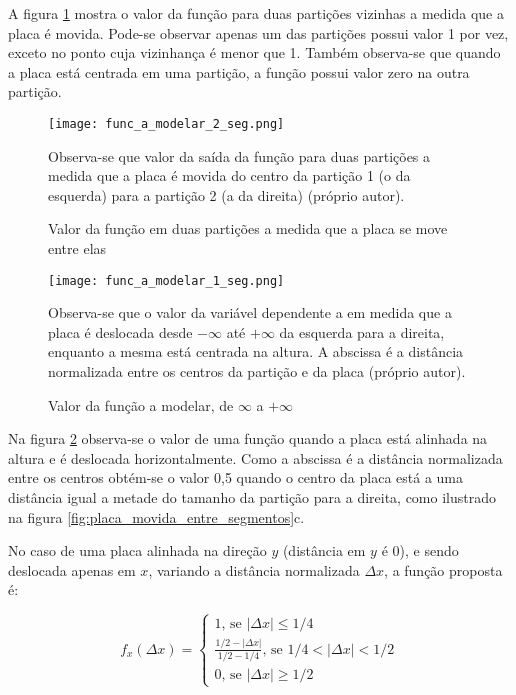 A figura \ref{fig:func_a_modelar_2_seg} mostra o valor da função para
duas partições vizinhas a medida que a placa é movida. Pode-se observar apenas
um das partições possui valor 1 por vez, exceto no ponto cuja vizinhança é
menor que 1. Também observa-se
que quando a placa está centrada em uma partição, a função possui valor zero
na outra partição.

\begin{figure}[!htb]
	\centering
	\texttt{[image: func\_a\_modelar\_2\_seg.png]}
	\caption{Valor da função em duas partições a medida que a placa se move
	entre elas}
	\label{fig:func_a_modelar_2_seg}
	Observa-se que valor da saída da função para duas partições a medida que a
	placa é movida do centro da partição 1 (o da esquerda) para a partição 2 (a
	da direita) (próprio autor).
\end{figure}

\begin{figure}[!htb]
	\centering
	\texttt{[image: func\_a\_modelar\_1\_seg.png]}
	\caption{Valor da função a modelar, de $\infty$ a $+\infty$}
	\label{fig:func_a_modelar_1_seg}
	Observa-se que o valor da variável dependente a em medida que a placa
	é deslocada desde $-\infty$ até $+\infty$ da esquerda para a direita,
	enquanto a mesma está centrada na altura. A abscissa é a distância
	normalizada entre os centros da partição e da placa (próprio autor).
\end{figure}

Na figura \ref{fig:func_a_modelar_1_seg} observa-se o valor de uma função
quando a placa está alinhada na altura e é deslocada horizontalmente. Como
a abscissa é a distância normalizada entre os centros obtém-se o valor 0,5
quando o centro da placa está a uma distância igual a metade do tamanho da
partição para a direita, como ilustrado na figura
\ref{fig:placa_movida_entre_segmentos}c.

No caso de uma placa alinhada na direção $y$ (distância em $y$ é 0), e sendo
deslocada apenas em $x$, variando a distância normalizada $\Delta x$, a função
proposta é:

\begin{equation}
	f_x(\Delta x) = \begin{cases}
		1 \text{, se } |\Delta x| \leq 1/4
		\\
		\frac{1/2-|\Delta x|}{1/2-1/4} \text{, se } 1/4<|\Delta x|<1/2
		\\
		0 \text{, se } |\Delta x| \geq 1/2
	\end{cases}
\end{equation}

